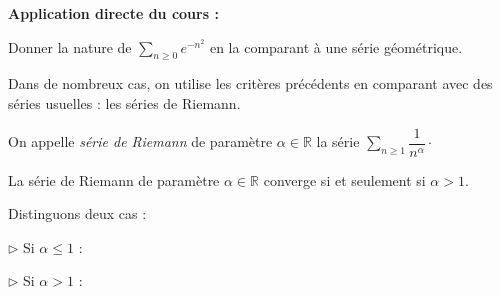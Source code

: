 \documentclass[french,11pt,twoside]{VcCours}
\newenvironment{ApplicationDirecte}{\textbf{Application directe du cours :}

}{}
\newcommand{\dx}{\text{d}x}
\newcommand{\Sum}[2]{\ensuremath{\textstyle{\sum\limits_{#1}^{#2}}}}
\begin{document}
\begin{ApplicationDirecte} Donner la nature de $ \Sum{n \geq 0}{}  e^{-n^2}$ en la comparant à une série géométrique.
\end{ApplicationDirecte}

Dans de nombreux cas, on utilise les critères précédents en comparant avec des séries usuelles : les séries de Riemann.


\begin{Definition}{}
On appelle \emph{série de Riemann} de paramètre $\alpha \in \mathbb{R}$ la série $\Sum{n \geq 1}{} \dfrac{1}{n^{\alpha}} \cdot$
\end{Definition}

\begin{Theoreme}{}
La série de Riemann de paramètre $\alpha \in \mathbb{R}$ converge si et seulement si $\alpha >1$.
\end{Theoreme}

\begin{Demonstration}{} Distinguons deux cas :

$\rhd$ Si $\alpha \leq 1$ :

%

\vspace{3cm}

$\rhd$ Si $\alpha>1$ :
%

\vspace*{8cm}

$\phantom{test}$ 

\vspace*{7cm}
\end{Demonstration}
\end{document}
